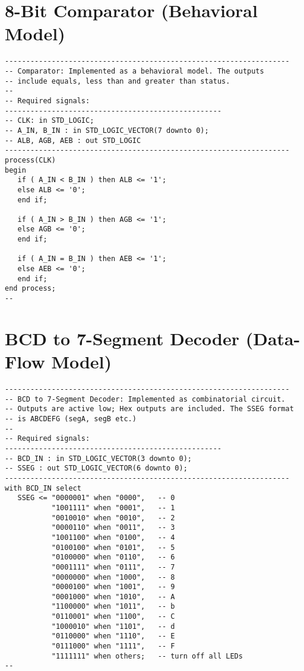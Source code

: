 \section{8-Bit Comparator (Behavioral Model)}
\noindent
\begin{minipage}{1\linewidth}
\begin{lstlisting}
-------------------------------------------------------------------
-- Comparator: Implemented as a behavioral model. The outputs 
-- include equals, less than and greater than status.  
-- 
-- Required signals: 
---------------------------------------------------
-- CLK: in STD_LOGIC;
-- A_IN, B_IN : in STD_LOGIC_VECTOR(7 downto 0);
-- ALB, AGB, AEB : out STD_LOGIC
-------------------------------------------------------------------
process(CLK)
begin
   if ( A_IN < B_IN ) then ALB <= '1';
   else ALB <= '0';
   end if;
    
   if ( A_IN > B_IN ) then AGB <= '1';
   else AGB <= '0';
   end if;
    
   if ( A_IN = B_IN ) then AEB <= '1';
   else AEB <= '0';
   end if;    
end process;
--
\end{lstlisting}
\end{minipage}

\section{BCD to 7-Segment Decoder (Data-Flow Model)}
\noindent
\begin{minipage}{1\linewidth}
\begin{lstlisting}
-------------------------------------------------------------------
-- BCD to 7-Segment Decoder: Implemented as combinatorial circuit.  
-- Outputs are active low; Hex outputs are included. The SSEG format
-- is ABCDEFG (segA, segB etc.)
--
-- Required signals: 
---------------------------------------------------
-- BCD_IN : in STD_LOGIC_VECTOR(3 downto 0);
-- SSEG : out STD_LOGIC_VECTOR(6 downto 0); 
-------------------------------------------------------------------   
with BCD_IN select
   SSEG <= "0000001" when "0000",   -- 0
           "1001111" when "0001",   -- 1
           "0010010" when "0010",   -- 2
           "0000110" when "0011",   -- 3
           "1001100" when "0100",   -- 4
           "0100100" when "0101",   -- 5
           "0100000" when "0110",   -- 6
           "0001111" when "0111",   -- 7
           "0000000" when "1000",   -- 8
           "0000100" when "1001",   -- 9
           "0001000" when "1010",   -- A
           "1100000" when "1011",   -- b
           "0110001" when "1100",   -- C
           "1000010" when "1101",   -- d
           "0110000" when "1110",   -- E
           "0111000" when "1111",   -- F
           "1111111" when others;   -- turn off all LEDs
--
\end{lstlisting}
\end{minipage}

